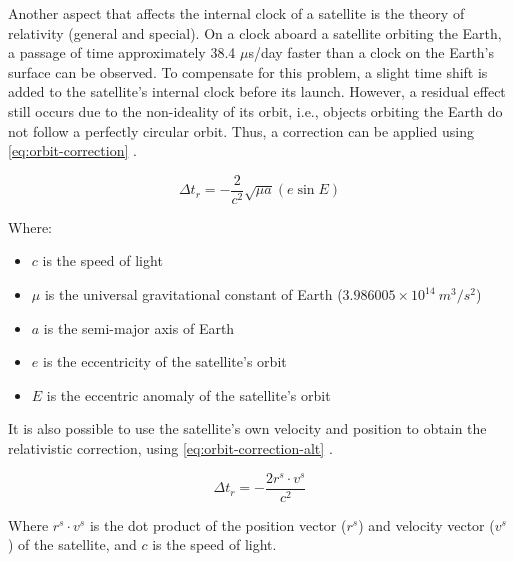Another aspect that affects the internal clock of a satellite is the theory of relativity (general and special). On a clock aboard a satellite orbiting the Earth, a passage of time approximately 38.4 $\mu$s/day faster than a clock on the Earth's surface can be observed. To compensate for this problem, a slight time shift is added to the satellite's internal clock before its launch. However, a residual effect still occurs due to the non-ideality of its orbit, i.e., objects orbiting the Earth do not follow a perfectly circular orbit. Thus, a correction can be applied using \autoref{eq:orbit-correction} \cite{hauschild2017}.

\begin{equation} \label{eq:orbit-correction}
    \Delta t_{r} = - \frac{2}{c^{2}} \sqrt{\mu a} (e \sin{E})
\end{equation}

Where:

\begin{itemize}
    \item $c$ is the speed of light
    \item $\mu$ is the universal gravitational constant of Earth ($3.986005 \times 10^{14}\ m^{3}/s^{2}$)
    \item $a$ is the semi-major axis of Earth
    \item $e$ is the eccentricity of the satellite's orbit
    \item $E$ is the eccentric anomaly of the satellite's orbit
\end{itemize}


It is also possible to use the satellite's own velocity and position to obtain the relativistic correction, using \autoref{eq:orbit-correction-alt} \cite{icd2010navstar}.

\begin{equation} \label{eq:orbit-correction-alt}
    \Delta t_{r} = -\frac{2 r^{s} \cdot v^{s}}{c^{2}}
\end{equation}


Where $r^{s} \cdot v^{s}$ is the dot product of the position vector ($r^{s}$) and velocity vector ($v^{s}$) of the satellite, and $c$ is the speed of light.

